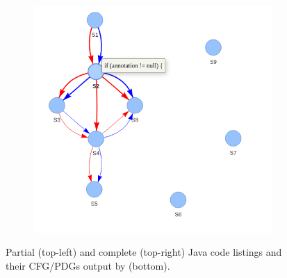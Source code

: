 \begin{figure}[hbt!]
\begin{subfigure}[b]{.45\textwidth}
  \includegraphics[width=\linewidth]{icse23-demo-figures/lst-complete.png}
\end{subfigure}
\caption{Partial (top-left) and complete (top-right) Java code listings and their CFG/PDGs output by \tool (bottom).}
\label{fig:demo}
\end{figure}